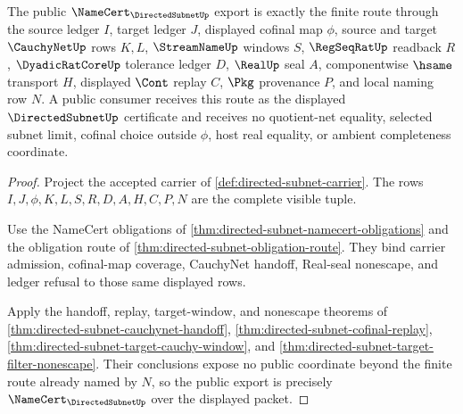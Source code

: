 \begin{theorem}
\label{thm:directed-subnet-public-namecert}
The public $\NameCert_{\DirectedSubnetUp}$ export is exactly the finite route through the source ledger $I$, target ledger $J$, displayed cofinal map $\phi$, source and target $\CauchyNetUp$ rows $K,L$, $\StreamNameUp$ windows $S$, $\RegSeqRatUp$ readback $R$, $\DyadicRatCoreUp$ tolerance ledger $D$, $\RealUp$ seal $A$, componentwise $\hsame$ transport $H$, displayed $\Cont$ replay $C$, $\Pkg$ provenance $P$, and local naming row $N$. A public consumer receives this route as the displayed $\DirectedSubnetUp$ certificate and receives no quotient-net equality, selected subnet limit, cofinal choice outside $\phi$, host real equality, or ambient completeness coordinate.
\end{theorem}
\begin{proof}
Project the accepted carrier of \autoref{def:directed-subnet-carrier}. The rows $I,J,\phi,K,L,S,R,D,A,H,C,P,N$ are the complete visible tuple.

Use the NameCert obligations of \autoref{thm:directed-subnet-namecert-obligations} and the obligation route of \autoref{thm:directed-subnet-obligation-route}. They bind carrier admission, cofinal-map coverage, CauchyNet handoff, Real-seal nonescape, and ledger refusal to those same displayed rows.

Apply the handoff, replay, target-window, and nonescape theorems of \autoref{thm:directed-subnet-cauchynet-handoff}, \autoref{thm:directed-subnet-cofinal-replay}, \autoref{thm:directed-subnet-target-cauchy-window}, and \autoref{thm:directed-subnet-target-filter-nonescape}. Their conclusions expose no public coordinate beyond the finite route already named by $N$, so the public export is precisely $\NameCert_{\DirectedSubnetUp}$ over the displayed packet.
\end{proof}

